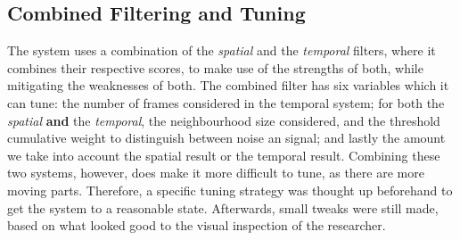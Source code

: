 % 


\subsection{Combined Filtering and Tuning}
\label{sub-section: tracking method - data filtering - combined filtering and tuning}

The system uses a combination of the \textit{spatial} and the \textit{temporal} filters, where it combines their respective scores, to make use of the strengths of both, while mitigating the weaknesses of both.
The combined filter has six variables which it can tune: the number of frames considered in the temporal system; for both the \textit{spatial} \textbf{and} the \textit{temporal}, the neighbourhood size considered, and the threshold cumulative weight to distinguish between noise an signal; and lastly the amount we take into account the spatial result or the temporal result.
Combining these two systems, however, does make it more difficult to tune, as there are more moving parts.
Therefore, a specific tuning strategy was thought up beforehand to get the system to a reasonable state. Afterwards, small tweaks were still made, based on what looked good to the visual inspection of the researcher.

